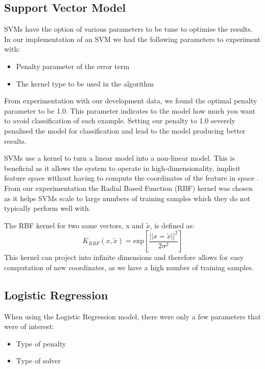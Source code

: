 \documentclass[bsc,frontabs,twoside,singlespacing,parskip,deptreport]{infthesis}     %
\begin{document}
 \subsection{Support Vector Model}
 SVMs have the option of various parameters to be tune to optimise the results.
 In our implementation of an SVM we had the following parameters to experiment with:
 \begin{itemize}
 \item Penalty parameter of the error term
 \item The kernel type to be used in the algorithm
 \end{itemize}

 From experimentation with our development data, we found the optimal penalty parameter to be 1.0.
 This parameter indicates to the model how much you want to avoid classification of each example.
 Setting our penalty to 1.0 severely penalised the model for classification and lead to the model producing
 better results.

 SVMs use a kernel to turn a linear model into a non-linear model. This is beneficial as it allows the system
 to operate in high-dimensionality, implicit feature space without having to compute the coordinates of the feature
 in space \cite{hofmann2008kernel}.
 From our experimentation the Radial Based Function (RBF) kernel was chosen as it helps SVMs scale to large numbers of
 training samples which they do not typically perform well with.

 The RBF kernel for two same vectors, x and $\tilde{x}$, is defined as:
 \begin{equation}
   K_{RBF} (x, \tilde{x}) = \text{exp}[ \frac{||x =\tilde{x}||^2}{2\sigma^2}]\nonumber
 \end{equation}
\cite{hofmann2008kernel}
 This kernel can project into infinite dimensions and therefore allows for easy computation of new coordinates, as
 we have a high number of training samples.
 
 \subsection{Logistic Regression}\label{sec:log-reg}
 When using the Logistic Regression model, there were only a few parameters that were of interest:
 \begin{itemize}
   \item Type of penalty
   \item Type of solver
 \end{itemize}
\end{document}
